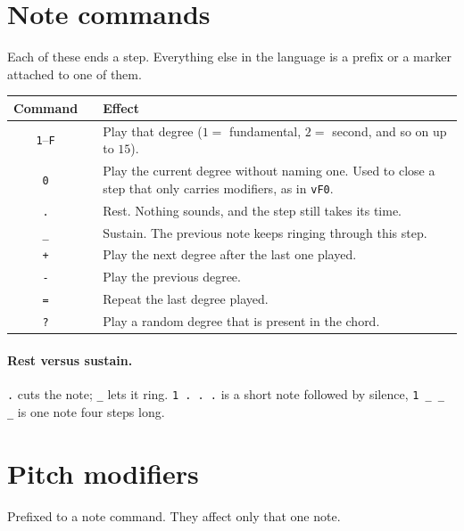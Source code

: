 \documentclass[11pt,a4paper]{article}
\newcommand{\pat}[1]{\texttt{#1}}
\begin{document}
\section{Note commands}

Each of these ends a step. Everything else in the language is a prefix or a
marker attached to one of them.

\begin{center}
\begin{tabular}{@{}clp{85mm}@{}}
\toprule
\textbf{Command} & & \textbf{Effect}\\
\midrule
\pat{1}--\pat{F} & & Play that degree ($1 =$ fundamental, $2 =$ second, and so
                     on up to $15$).\\
\pat{0}          & & Play the current degree without naming one. Used to close
                     a step that only carries modifiers, as in \pat{vF0}.\\
\pat{.}          & & Rest. Nothing sounds, and the step still takes its time.\\
\pat{\_}         & & Sustain. The previous note keeps ringing through this
                     step.\\
\pat{+}          & & Play the next degree after the last one played.\\
\pat{-}          & & Play the previous degree.\\
\pat{=}          & & Repeat the last degree played.\\
\pat{?}          & & Play a random degree that is present in the chord.\\
\bottomrule
\end{tabular}
\end{center}

\paragraph{Rest versus sustain.} \pat{.} cuts the note; \pat{\_} lets it ring.
\pat{1 . . .} is a short note followed by silence, \pat{1 \_ \_ \_} is one note
four steps long.

\section{Pitch modifiers}
\label{sec:pitch}

Prefixed to a note command. They affect only that one note.
\end{document}
